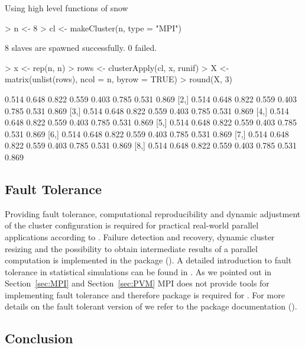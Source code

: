 \begin{Example} Using high level functions of snow
\begin{Schunk}
\begin{Sinput}
> n <- 8
> cl <- makeCluster(n, type = "MPI")
\end{Sinput}
\begin{Soutput}
	8 slaves are spawned successfully. 0 failed.
\end{Soutput}
\begin{Sinput}
> x <- rep(n, n)
> rows <- clusterApply(cl, x, runif)
> X <- matrix(unlist(rows), ncol = n, byrow = TRUE)
> round(X, 3)
\end{Sinput}
\begin{Soutput}
      [,1]  [,2]  [,3]  [,4]  [,5]  [,6]  [,7]  [,8]
[1,] 0.514 0.648 0.822 0.559 0.403 0.785 0.531 0.869
[2,] 0.514 0.648 0.822 0.559 0.403 0.785 0.531 0.869
[3,] 0.514 0.648 0.822 0.559 0.403 0.785 0.531 0.869
[4,] 0.514 0.648 0.822 0.559 0.403 0.785 0.531 0.869
[5,] 0.514 0.648 0.822 0.559 0.403 0.785 0.531 0.869
[6,] 0.514 0.648 0.822 0.559 0.403 0.785 0.531 0.869
[7,] 0.514 0.648 0.822 0.559 0.403 0.785 0.531 0.869
[8,] 0.514 0.648 0.822 0.559 0.403 0.785 0.531 0.869
\end{Soutput}
\end{Schunk}
\label{ex:snowapply}
\end{Example}

\subsection{Fault Tolerance}

Providing fault tolerance, computational reproducibility and dynamic
adjustment of the cluster configuration is required for practical
real-world parallel applications according to
\cite{sevcikova04pragmatic}. Failure detection and recovery, dynamic
cluster resizing and the possibility to obtain intermediate results of
a parallel computation is implemented in the package 
(\cite{sevcikova04snowFT}). A detailed introduction to fault tolerance
in statistical simulations can be found in
\cite{sevcikova04simulations}. As we pointed out in
Section~\ref{sec:MPI} and Section~\ref{sec:PVM} MPI does not provide
tools for implementing fault tolerance and therefore package
 is required for . For more details on the fault
tolerant version of  we refer to the package documentation
(\cite{sevcikova04snowFT}).

\subsection{Conclusion}

